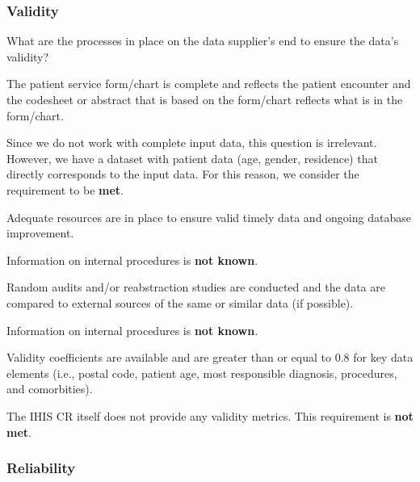 \subsubsection{Validity}

What are the processes in place on the data supplier's end to ensure the data's validity?

\begin{QandA}
    \item The patient service form/chart is complete and reflects the patient encounter and the codesheet or abstract that is based on the form/chart reflects what is in the form/chart.
    \begin{answered}
        Since we do not work with complete input data, this question is irrelevant.
        However, we have a dataset with patient data (age, gender, residence) that directly corresponds to the input data.
        For this reason, we consider the requirement to be \textbf{met}.
    \end{answered}

    \item Adequate resources are in place to ensure valid timely data and ongoing database improvement.
    \begin{answered}
        Information on internal procedures is \textbf{not known}.
    \end{answered}

    \item Random audits and/or reabstraction studies are conducted and the data are compared to external sources of the same or similar data (if possible).
    \begin{answered}
        Information on internal procedures is \textbf{not known}.
    \end{answered}

    \item Validity coefficients are available and are greater than or equal to 0.8 for key data elements (i.e., postal code, patient age, most responsible diagnosis, procedures, and comorbities).
    \begin{answered}
        The IHIS CR itself does not provide any validity metrics.
        This requirement is \textbf{not met}.
    \end{answered}

\end{QandA}

\subsubsection{Reliability}

